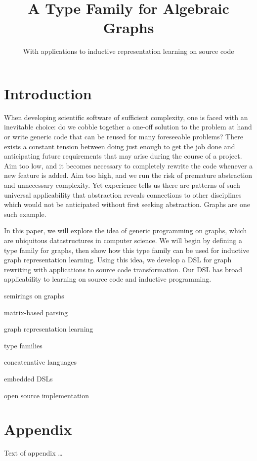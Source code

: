 \documentclass[sigplan,10pt,review,anonymous]{acmart}
\begin{document}
\title{A Type Family for Algebraic Graphs}
\subtitle{With applications to inductive representation learning on source code}
\begin{abstract}

\end{abstract}
\maketitle

\section{Introduction}

When developing scientific software of sufficient complexity, one is faced with an inevitable choice: do we cobble together a one-off solution to the problem at hand or write generic code that can be reused for many foreseeable problems? There exists a constant tension between doing just enough to get the job done and anticipating future requirements that may arise during the course of a project. Aim too low, and it becomes necessary to completely rewrite the code whenever a new feature is added. Aim too high, and we run the risk of premature abstraction and unnecessary complexity. Yet experience tells us there are patterns of such universal applicability that abstraction reveals connections to other disciplines which would not be anticipated without first seeking abstraction. Graphs are one such example.

In this paper, we will explore the idea of generic programming on graphs, which are ubiquitous datastructures in computer science. We will begin by defining a type family for graphs, then show how this type family can be used for inductive graph representation learning. Using this idea, we develop a DSL for graph rewriting with applications to source code transformation. Our DSL has broad applicability to learning on source code and inductive programming.

semirings on graphs

matrix-based parsing

graph representation learning

type families

concatenative languages

embedded DSLs

open source implementation




\appendix
\section{Appendix}

Text of appendix \ldots
\end{document}
